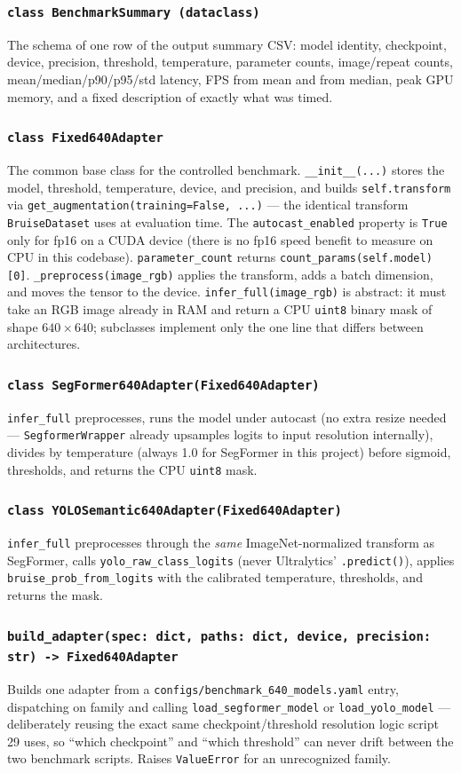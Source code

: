 \documentclass[11pt]{article}
\newcommand{\func}[1]{\subsubsection*{\texttt{#1}}}
\begin{document}
\func{class BenchmarkSummary (dataclass)}
The schema of one row of the output summary CSV: model identity, checkpoint,
device, precision, threshold, temperature, parameter counts, image/repeat
counts, mean/median/p90/p95/std latency, FPS from mean and from median, peak GPU
memory, and a fixed description of exactly what was timed.

\func{class Fixed640Adapter}
The common base class for the controlled benchmark.
\texttt{\_\_init\_\_(...)} stores the model, threshold, temperature, device, and
precision, and builds \texttt{self.transform} via
\texttt{get\_augmentation(training=False, ...)} --- the identical transform
\texttt{BruiseDataset} uses at evaluation time. The \texttt{autocast\_enabled}
property is \texttt{True} only for fp16 on a CUDA device (there is no fp16
speed benefit to measure on CPU in this codebase).
\texttt{parameter\_count} returns \texttt{count\_params(self.model)[0]}.
\texttt{\_preprocess(image\_rgb)} applies the transform, adds a batch dimension,
and moves the tensor to the device. \texttt{infer\_full(image\_rgb)} is abstract:
it must take an RGB image already in RAM and return a CPU \texttt{uint8} binary
mask of shape $640 \times 640$; subclasses implement only the one line that
differs between architectures.

\func{class SegFormer640Adapter(Fixed640Adapter)}
\texttt{infer\_full} preprocesses, runs the model under autocast (no extra
resize needed --- \texttt{SegformerWrapper} already upsamples logits to input
resolution internally), divides by temperature (always 1.0 for SegFormer in
this project) before sigmoid, thresholds, and returns the CPU \texttt{uint8}
mask.

\func{class YOLOSemantic640Adapter(Fixed640Adapter)}
\texttt{infer\_full} preprocesses through the \emph{same} ImageNet-normalized
transform as SegFormer, calls \texttt{yolo\_raw\_class\_logits} (never
Ultralytics' \texttt{.predict()}), applies \texttt{bruise\_prob\_from\_logits}
with the calibrated temperature, thresholds, and returns the mask.

\func{build\_adapter(spec: dict, paths: dict, device, precision: str) -> Fixed640Adapter}
Builds one adapter from a \texttt{configs/benchmark\_640\_models.yaml} entry,
dispatching on family and calling \texttt{load\_segformer\_model} or
\texttt{load\_yolo\_model} --- deliberately reusing the exact same
checkpoint/threshold resolution logic script 29 uses, so ``which checkpoint''
and ``which threshold'' can never drift between the two benchmark scripts.
Raises \texttt{ValueError} for an unrecognized family.
\end{document}
